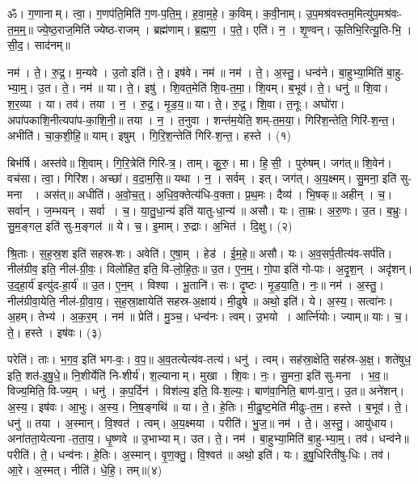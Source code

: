 
ॐ। ग॒णानाम्। त्वा॒। ग॒णप॑ति॒मिति॑ ग॒ण-प॒ति॒म्॒। ह॒वा॒म॒हे॒। क॒विम्। क॒वी॒नाम्। उ॒प॒मश्र॑वस्तम॒मित्यु॑प॒मश्र॑वः-त॒म॒म्॒॥ 
ज्ये॒ष्ठ॒राज॒मिति॑ ज्येष्ठ-राजम्। ब्रह्म॑णाम्। ब्र॒ह्म॒ण॒। प॒ते॒। एति॑। न॒। शृ॒ण्वन्। ऊ॒तिभि॒रित्यू॒ति-भि॒। सी॒द॒। साद॑नम्॥ 


नम॑। ते॒। रु॒द्र॒। म॒न्यवे। उ॒तो इति॑। ते॒। इष॑वे। नम॑॥ 
नम॑। ते॒। अ॒स्तु॒। धन्व॑ने। बा॒हुभ्या॒मिति॑ बा॒हु-भ्या॒म्॒। उ॒त। ते॒। नम॑॥ 
या। ते॒। इषु॑। शि॒वत॒मेति॑ शि॒व-त॒मा॒। शि॒वम्। ब॒भूव॑। ते॒। धनु॑॥ 
शि॒वा। श॒र॒व्या। या। तव॑। तया। न॒। रु॒द्र॒। मृ॒ड॒य॒॥ 
या। ते॒। रु॒द्र॒। शि॒वा। त॒नूः। अघो॑रा। अपा॑पकाशि॒नीत्यपा॑प-का॒शि॒नी॒॥ 
तया। न॒। त॒नुवा। शन्त॑म॒येति॒ शम्-त॒म॒या॒। गिरि॑श॒न्तेति॒ गिरि॑-श॒न्त॒। अभीति॑। चा॒क॒शी॒हि॒॥ 
याम्। इषुम्। गि॒रि॒श॒न्तेति॑ गिरि-श॒न्त॒। हस्ते। (१)


बिभ॑र्षि। अस्त॑वे॥ 
शि॒वाम्। गि॒रि॒त्रेति॑ गिरि-त्र॒। ताम्। कु॒रु॒। मा। हि॒सी॒। पुरु॑षम्। जग॑त्॥ 
शि॒वेन॑। वच॑सा। त्वा॒। गिरि॑श। अच्छा॑। व॒दा॒म॒सि॒॥ 
यथा। न॒। सर्वम्। इत्। जग॑त्। अ॒य॒क्ष्मम्। सु॒मना॒ इति॑ सु-मना । अस॑त्॥ 
अधीति॑। अ॒वो॒च॒त्॒। अ॒धि॒व॒क्तेत्य॑धि-व॒क्ता। प्र॒थ॒मः। दैव्य॑। भि॒षक्॥ 
अहीन्। च॒। सर्वान्। ज॒म्भयन्। सर्वा। च॒। या॒तु॒धा॒न्य॑ इति॑ यातु-धा॒न्य॑॥ 
असौ। यः। ता॒म्रः। अ॒रु॒णः। उ॒त। ब॒भ्रुः। सु॒म॒ङ्गल॒ इति॑ सु-म॒ङ्गल॑॥ 
ये। च॒। इ॒माम्। रु॒द्राः। अ॒भित॑। दि॒क्षु। (२)


श्रि॒ताः। स॒ह॒स्र॒श इति॑ सहस्र-शः। अवेति॑। ए॒षा॒म्। हेड॑। ई॒म॒हे॒॥ 
असौ। यः। अ॒व॒सर्प॒तीत्य॑व-सर्प॑ति। नील॑ग्रीव॒ इति॒ नील॑-ग्री॒वः॒। विलो॑हित॒ इति॒ वि-लो॒हि॒तः॒॥ 
उ॒त। ए॒न॒म्॒। गो॒पा इति॑ गो-पाः। अ॒दृ॒श॒न्। अदृ॑शन्। उ॒द॒हा॒र्य॑ इत्यु॑द-हा॒र्य॑॥ 
उ॒त। ए॒न॒म्। विश्वा। भू॒तानि॑। सः। दृ॒ष्टः। मृ॒ड॒या॒ति॒। नः॒॥ 
नम॑। अ॒स्तु॒। नील॑ग्रीवा॒येति॒ नील॑-ग्री॒वा॒य॒। स॒ह॒स्रा॒क्षायेति॑ सहस्र-अ॒क्षाय॑। मी॒ढुषे॥
अथो॒ इति॑। ये। अ॒स्य॒। सत्वा॑नः। अ॒हम्। तेभ्य॑। अ॒क॒र॒म्। नम॑॥ 
प्रेति॑। मु॒ञ्च॒। धन्व॑नः। त्वम्। उ॒भयो। आर्त्नि॑योः। ज्याम्॥ 
याः। च॒। ते॒। हस्ते। इष॑वः। (३)


परेति॑। ताः। भ॒ग॒व॒ इति॑ भग-वः॒। व॒प॒॥ 
अ॒व॒तत्येत्य॑व-तत्य॑। धनु॑। त्वम्। सह॑स्रा॒क्षेति॒ सह॑स्र-अ॒क्ष॒। शते॑षुध॒ इति॒ शत॑-इ॒षु॒धे॒॥ 
नि॒शीर्येति॑ नि-शीर्य॑। श॒ल्यानाम्। मुखा। शि॒वः। नः॒। सु॒मना॒ इति॑ सु-मना। भ॒व॒॥ 
विज्य॒मिति॒ वि-ज्य॒म्। धनु॑। क॒प॒र्दिन॑। विश॑ल्य॒ इति॒ वि-श॒ल्यः॒। बाण॑वा॒निति॒ बाण॑-वा॒न्॒। उ॒त॥ 
अने॑शन्। अ॒स्य॒। इष॑वः। आ॒भुः। अ॒स्य॒। नि॒ष॒ङ्गथि॑॥ 
या। ते॒। हे॒तिः। मी॒ढु॒ष्ट॒मेति॑ मीढुः-त॒म॒। हस्ते। ब॒भूव॑। ते॒। धनु॑॥ 
तया। अ॒स्मान्। वि॒श्वत॑। त्वम्। अ॒य॒क्ष्मया। परीति॑। भु॒ज॒॥ 
नम॑। ते॒। अ॒स्तु॒। आयु॑धाय। अना॑तता॒येत्यना-त॒ता॒य॒। धृ॒ष्णवे॥ 
उ॒भाभ्याम्। उत। ते॒। नम॑। बा॒हुभ्या॒मिति॑ बा॒हु-भ्या॒म्॒। तव॑। धन्व॑ने॥ 
परीति॑। ते॒। धन्व॑नः। हे॒तिः। अ॒स्मान्। वृ॒ण॒क्तु॒। वि॒श्वत॑॥
 अथो॒ इति॑। यः। इ॒षु॒धिरिती॑षु-धिः। तव॑। आ॒रे। अ॒स्मत्। नीति॑। धे॒हि॒। तम्॥(४)


